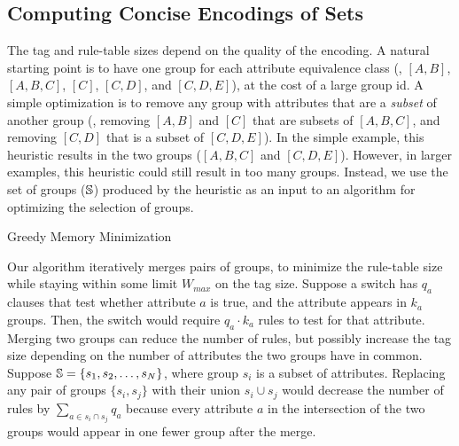 \subsection{Computing Concise Encodings of Sets}
\label{ssec:merge}
The tag and rule-table sizes depend on the quality of the encoding.  A
natural starting point is to have one group for each attribute
equivalence class (\eg, $[A,B]$, $[A,B,C]$, $[C]$, $[C,D]$, and
$[C,D,E]$), at the cost of a large group id.  A simple optimization is
to remove any group with attributes that are a \emph{subset} of
another group (\eg, removing $[A,B]$ and $[C]$ that are subsets of
$[A,B,C]$, and removing $[C,D]$ that is a subset of $[C,D,E]$).  In
the simple example, this heuristic results in the two groups
($[A,B,C]$ and $[C,D,E]$).  However, in larger examples, this
heuristic could still result in too many groups. Instead, we use the
set of groups ($\mathbb{S}$) produced by the heuristic as an input to an
algorithm for optimizing the selection of groups.

\begin{algorithm}
\DontPrintSemicolon
{}
\caption{Greedy Memory Minimization\label{alg:memory_min}}
\end{algorithm}

Our algorithm iteratively merges pairs of groups, to minimize the
rule-table size while staying within some limit $W_{max}$ on the tag
size.  Suppose a switch has $q_a$ clauses that test whether attribute
$a$ is true, and the attribute appears in $k_a$ groups.  Then, the
switch would require $q_a \cdot k_a$ rules to test for that attribute.
Merging two groups can reduce the number of rules, but possibly
increase the tag size depending on the number of attributes the two
groups have in common.  Suppose $\mathbb{S} = \{s_1, s_2, \dots, s_N\}$,
where group $s_i$ is a subset of attributes.  Replacing any pair of
groups $\{s_i, s_j\}$ with their union $s_i\cup s_j$ would decrease
the number of rules by $\sum_{a \in s_i\cap s_j}q_a$ because every
attribute $a$ in the intersection of the two groups would appear in
one fewer group after the merge.

